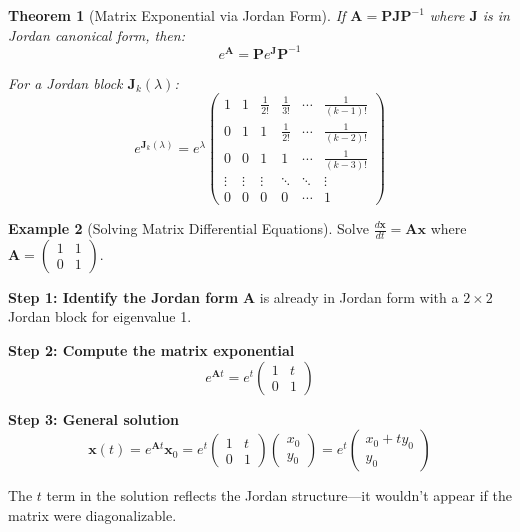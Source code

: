 \documentclass[12pt]{article}
\numberwithin{equation}{section}
\newcommand{\vect}[1]{\boldsymbol{#1}}   %
\newcommand{\mat}[1]{\mathbf{#1}}        %
\theoremstyle{plain}
\newtheorem{theorem}{Theorem}[section]
\theoremstyle{definition}
\newtheorem{example}[theorem]{Example}
\theoremstyle{remark}
\begin{document}
\begin{theorem}[Matrix Exponential via Jordan Form]
If $\mat{A} = \mat{P}\mat{J}\mat{P}^{-1}$ where $\mat{J}$ is in Jordan canonical form, then:
$$e^{\mat{A}} = \mat{P}e^{\mat{J}}\mat{P}^{-1}$$

For a Jordan block $\mat{J}_k(\lambda)$:
$$e^{\mat{J}_k(\lambda)} = e^{\lambda}\begin{pmatrix}
1 & 1 & \frac{1}{2!} & \frac{1}{3!} & \cdots & \frac{1}{(k-1)!} \\
0 & 1 & 1 & \frac{1}{2!} & \cdots & \frac{1}{(k-2)!} \\
0 & 0 & 1 & 1 & \cdots & \frac{1}{(k-3)!} \\
\vdots & \vdots & \vdots & \ddots & \ddots & \vdots \\
0 & 0 & 0 & 0 & \cdots & 1
\end{pmatrix}$$
\end{theorem}

\begin{example}[Solving Matrix Differential Equations]
Solve $\frac{d\vect{x}}{dt} = \mat{A}\vect{x}$ where $\mat{A} = \begin{pmatrix} 1 & 1 \\ 0 & 1 \end{pmatrix}$.

\textbf{Step 1: Identify the Jordan form}
$\mat{A}$ is already in Jordan form with a $2 \times 2$ Jordan block for eigenvalue 1.

\textbf{Step 2: Compute the matrix exponential}
$$e^{\mat{A}t} = e^t\begin{pmatrix} 1 & t \\ 0 & 1 \end{pmatrix}$$

\textbf{Step 3: General solution}
$$\vect{x}(t) = e^{\mat{A}t}\vect{x}_0 = e^t\begin{pmatrix} 1 & t \\ 0 & 1 \end{pmatrix}\begin{pmatrix} x_0 \\ y_0 \end{pmatrix} = e^t\begin{pmatrix} x_0 + ty_0 \\ y_0 \end{pmatrix}$$

The $t$ term in the solution reflects the Jordan structure—it wouldn't appear if the matrix were diagonalizable.
\end{example}
\end{document}
